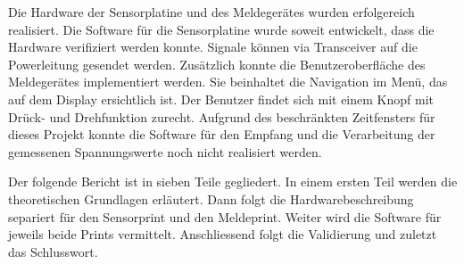 Die Hardware der Sensorplatine und des Meldegerätes wurden erfolgereich realisiert. Die Software für die Sensorplatine wurde soweit entwickelt, dass die Hardware verifiziert werden konnte. Signale können via Transceiver auf die Powerleitung gesendet werden. Zusätzlich konnte die Benutzeroberfläche des Meldegerätes implementiert werden. Sie beinhaltet die Navigation im Menü, das auf dem Display ersichtlich ist. Der Benutzer findet sich mit einem Knopf mit Drück- und Drehfunktion zurecht. Aufgrund des beschränkten Zeitfensters für dieses Projekt konnte die Software für den Empfang und die Verarbeitung der gemessenen Spannungswerte noch nicht realisiert werden.

Der folgende Bericht ist in sieben Teile gegliedert. In einem ersten Teil werden die theoretischen Grundlagen erläutert. Dann folgt die Hardwarebeschreibung separiert für den Sensorprint und den Meldeprint. Weiter wird die Software für jeweils beide Prints vermittelt. Anschliessend folgt die Validierung und zuletzt das Schlusswort.
